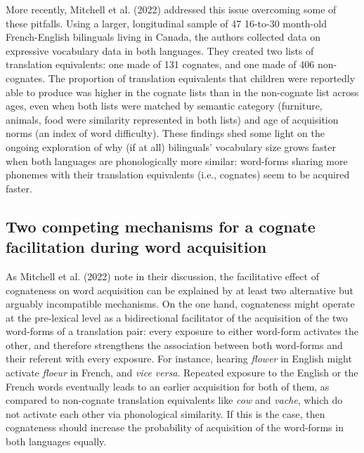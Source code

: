 \documentclass[
  letterpaper,
  DIV=11,
  numbers=noendperiod]{scrartcl}
\begin{document}
More recently, Mitchell et al. (2022) addressed this issue overcoming
some of these pitfalls. Using a larger, longitudinal sample of 47
16-to-30 month-old French-English bilinguals living in Canada, the
authors collected data on expressive vocabulary data in both languages.
They created two lists of translation equivalents: one made of 131
cognates, and one made of 406 non-cognates. The proportion of
translation equivalents that children were reportedly able to produce
was higher in the cognate lists than in the non-cognate list across
ages, even when both lists were matched by semantic category (furniture,
animals, food were similarity represented in both lists) and age of
acquisition norms (an index of word difficulty). These findings shed
some light on the ongoing exploration of why (if at all) bilinguals'
vocabulary size grows faster when both languages are phonologically more
similar: word-forms sharing more phonemes with their translation
equivalents (i.e., cognates) seem to be acquired faster.

\hypertarget{two-competing-mechanisms-for-a-cognate-facilitation-during-word-acquisition}{%
\subsection{Two competing mechanisms for a cognate facilitation during
word
acquisition}\label{two-competing-mechanisms-for-a-cognate-facilitation-during-word-acquisition}}

As Mitchell et al. (2022) note in their discussion, the facilitative
effect of cognateness on word acquisition can be explained by at least
two alternative but arguably incompatible mechanisms. On the one hand,
cognateness might operate at the pre-lexical level as a bidirectional
facilitator of the acquisition of the two word-forms of a translation
pair: every exposure to either word-form activates the other, and
therefore strengthens the association between both word-forms and their
referent with every exposure. For instance, hearing \emph{flower} in
English might activate \emph{floeur} in French, and \emph{vice versa}.
Repeated exposure to the English or the French words eventually leads to
an earlier acquisition for both of them, as compared to non-cognate
translation equivalents like \emph{cow} and \emph{vache}, which do not
activate each other via phonological similarity. If this is the case,
then cognateness should increase the probability of acquisition of the
word-forms in both languages equally.
\end{document}
